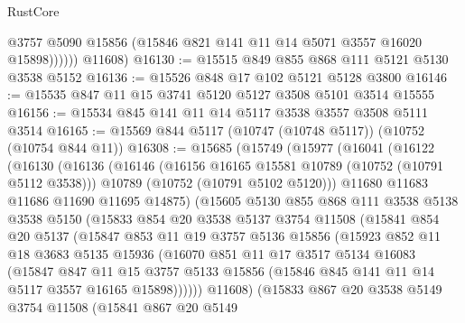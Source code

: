 \begin{lexlean}{RustCore}
\begin{coremodule}
                @3757
                @5090
                @15856
                (@15846 @821 @141 @11 @14 @5071 @3557 @16020 @15898))))))
      @11608)
@16130 := @15515 @849 @855 @868 @111 @5121 @5130 @3538 @5152
@16136 := @15526 @848 @17 @102 @5121 @5128 @3800
@16146 := @15535 @847 @11 @15 @3741 @5120 @5127 @3508 @5101 @3514 @15555
@16156 := @15534 @845 @141 @11 @14 @5117 @3538 @3557 @3508 @5111 @3514
@16165 := @15569 @844 @5117 (@10747 (@10748 @5117)) (@10752 (@10754 @844 @11))
@16308 := @15685
    (@15749
      (@15977
        (@16041
          (@16122
            (@16130
              (@16136
                (@16146
                  (@16156 @16165 @15581 @10789 (@10752 (@10791 @5112 @3538)))
                  @10789
                  (@10752 (@10791 @5102 @5120)))
                @11680
                @11683
                @11686
                @11690
                @11695
                @14875)
              (@15605
                @5130
                @855
                @868
                @111
                @3538
                @5138
                @3538
                @5150
                (@15833
                  @854
                  @20
                  @3538
                  @5137
                  @3754
                  @11508
                  (@15841
                    @854
                    @20
                    @5137
                    (@15847
                      @853
                      @11
                      @19
                      @3757
                      @5136
                      @15856
                      (@15923
                        @852
                        @11
                        @18
                        @3683
                        @5135
                        @15936
                        (@16070
                          @851
                          @11
                          @17
                          @3517
                          @5134
                          @16083
                          (@15847
                            @847
                            @11
                            @15
                            @3757
                            @5133
                            @15856
                            (@15846 @845 @141 @11 @14 @5117 @3557 @16165 @15898))))))
                  @11608)
                (@15833
                  @867
                  @20
                  @3538
                  @5149
                  @3754
                  @11508
                  (@15841
                    @867
                    @20
                    @5149

\end{coremodule}
\end{lexlean}
